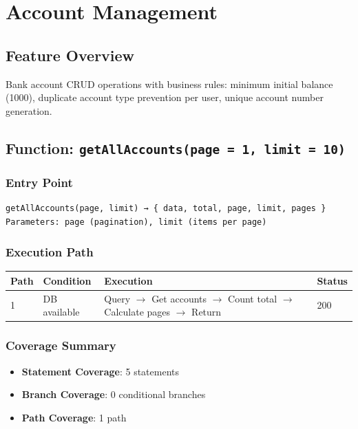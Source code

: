 \chapter{Account Management}

\section{Feature Overview}
Bank account CRUD operations with business rules: minimum initial balance (1000), duplicate account type prevention per user, unique account number generation.

\section{Function: \texttt{getAllAccounts(page = 1, limit = 10)}}

\subsection{Entry Point}
\begin{verbatim}
getAllAccounts(page, limit) → { data, total, page, limit, pages }
Parameters: page (pagination), limit (items per page)
\end{verbatim}

\subsection{Execution Path}

\begin{longtable}{|L{0.8cm}|L{3.5cm}|L{6cm}|L{1.5cm}|}
\hline
\textbf{Path} & \textbf{Condition} & \textbf{Execution} & \textbf{Status} \\
 & DB available & Query $\rightarrow$ Get accounts $\rightarrow$ Count total $\rightarrow$ Calculate pages $\rightarrow$ Return & 200 \\
\hline
\end{longtable}

\subsection{Coverage Summary}
\begin{itemize}
    \item \textbf{Statement Coverage}: 5 statements
    \item \textbf{Branch Coverage}: 0 conditional branches
    \item \textbf{Path Coverage}: 1 path
\end{itemize}

